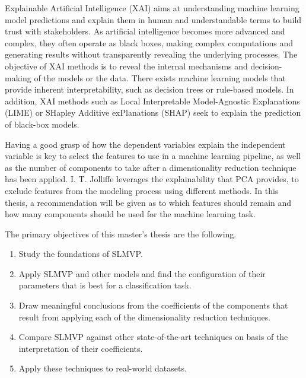Explainable Artificial Intelligence \cite{xai} (XAI) aims at understanding machine learning model predictions and explain them in human and understandable terms to build trust with stakeholders. As artificial intelligence becomes more advanced and complex, they often operate as black boxes, making complex computations and generating results without transparently revealing the underlying processes. The objective of XAI methods is to reveal the internal mechanisms and decision-making of the models or the data. There exists machine learning models that provide inherent interpretability, such as decision trees or rule-based models. In addition, XAI methods such as Local Interpretable Model-Agnostic Explanations \cite{lime} (LIME) or SHapley Additive exPlanations \cite{shap} (SHAP) seek to explain the prediction  of black-box models.

Having a good grasp of how the dependent variables explain the independent variable is key to select the features to use in a machine learning pipeline, as well as the number of components to take after a dimensionality reduction technique has been applied. I. T. Jolliffe \cite{b2b4} leverages the explainability that PCA provides, to exclude features from the modeling process using different methods. In this thesis, a recommendation will be given as to which features should remain and how many components should be used for the machine learning task.

The primary objectives of this master's thesis are the following.
\begin{enumerate}
    \item Study the foundations of SLMVP.
    \item Apply SLMVP and other models and find the configuration of their parameters that is best for a classification task.
    \item Draw meaningful conclusions from the coefficients of the components that result from applying each of the dimensionality reduction techniques.
    \item Compare SLMVP against other state-of-the-art techniques on basis of the interpretation of their coefficients.
    \item Apply these techniques to real-world datasets.
\end{enumerate}

